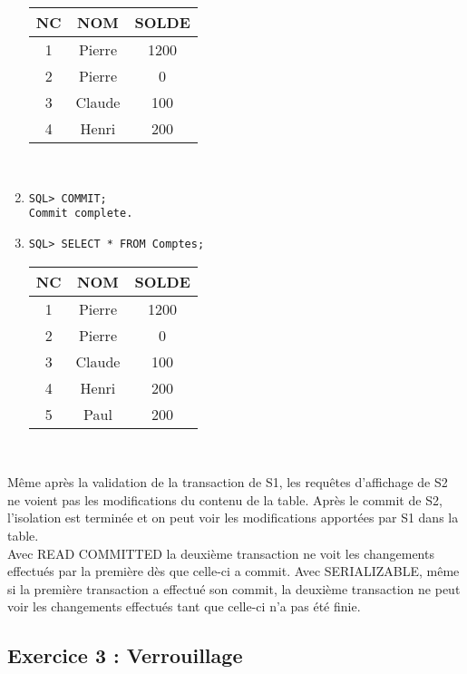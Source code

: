 \documentclass{article}
\begin{document}
\begin{enumerate}[label=\arabic*)]
\begin{tabular}{|c|c|c|}
	\hline
        	NC & NOM & SOLDE \\
	\hline        
 	1 & Pierre & 1200 \\
	\hline         
	2 & Pierre & 0 \\
	\hline
	3 & Claude & 100 \\
	\hline
	4 & Henri & 200 \\
	\hline
\end{tabular} \\

	\item {} 
		\begin{lstlisting}
SQL> COMMIT;
Commit complete.
		\end{lstlisting}

	\item {}
		\begin{lstlisting}
SQL> SELECT * FROM Comptes;
		\end{lstlisting}

\begin{tabular}{|c|c|c|}
	\hline
        	NC & NOM & SOLDE \\
	\hline        
 	1 & Pierre & 1200 \\
	\hline         
	2 & Pierre & 0 \\
	\hline
	3 & Claude & 100 \\
	\hline
	4 & Henri & 200 \\
	\hline
	5 & Paul & 200 \\
	\hline
\end{tabular} \\

\end{enumerate}

Même après la validation de la transaction de S1, les requêtes d'affichage de S2 ne voient pas les modifications du contenu de la table. Après le commit de S2, l'isolation est terminée et on peut voir les modifications apportées par S1 dans la table.\\

Avec READ COMMITTED la deuxième transaction ne voit les changements effectués par la première dès que celle-ci a commit.
Avec SERIALIZABLE, même si la première transaction a effectué son commit, la deuxième transaction ne peut voir les changements effectués tant que celle-ci n'a pas été finie. \\

\subsection*{Exercice 3 : Verrouillage}
\end{document}
